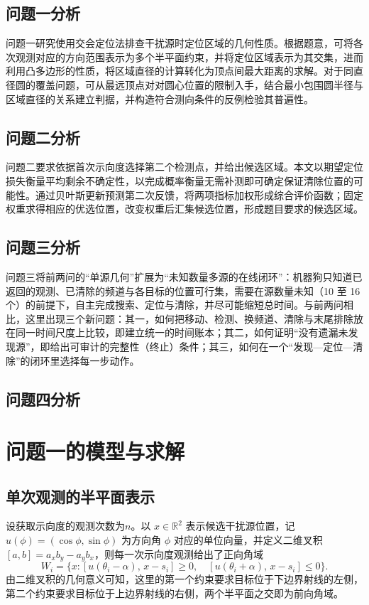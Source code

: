 \documentclass[UTF8,a4paper,zihao=-4,fontset=none]{ctexart}
\begin{document}
\subsection{问题一分析}

问题一研究使用交会定位法排查干扰源时定位区域的几何性质。根据题意，可将各次观测对应的方向范围表示为多个半平面约束，并将定位区域表示为其交集，进而利用凸多边形的性质，将区域直径的计算转化为顶点间最大距离的求解。对于同直径圆的覆盖问题，可从最远顶点对对圆心位置的限制入手，结合最小包围圆半径与区域直径的关系建立判据，并构造符合测向条件的反例检验其普遍性。

\subsection{问题二分析}

问题二要求依据首次示向度选择第二个检测点，并给出候选区域。本文以期望定位损失衡量平均剩余不确定性，以完成概率衡量无需补测即可确定保证清除位置的可能性。通过贝叶斯更新预测第二次反馈，将两项指标加权形成综合评价函数；固定权重求得相应的优选位置，改变权重后汇集候选位置，形成题目要求的候选区域。
\subsection{问题三分析}

问题三将前两问的“单源几何”扩展为“未知数量多源的在线闭环”：机器狗只知道已返回的观测、已清除的频道与各目标的位置可行集，需要在源数量未知（10 至 16 个）的前提下，自主完成搜索、定位与清除，并尽可能缩短总时间。与前两问相比，这里出现三个新问题：其一，如何把移动、检测、换频道、清除与末尾排除放在同一时间尺度上比较，即建立统一的时间账本；其二，如何证明“没有遗漏未发现源”，即给出可审计的完整性（终止）条件；其三，如何在一个“发现—定位—清除”的闭环里选择每一步动作。

\subsection{问题四分析}


\section{问题一的模型与求解}

\subsection{单次观测的半平面表示}

设获取示向度的观测次数为$n$。以 \(x\in\mathbb R^2\) 表示候选干扰源位置，记 \(u(\phi)=(\cos\phi,\sin\phi)\) 为方向角 \(\phi\) 对应的单位向量，并定义二维叉积 \([a,b]=a_xb_y-a_yb_x\)，则每一次示向度观测给出了正向角域
\begin{equation}
  W_i=\{x:[u(\theta_i-\alpha),\,x-s_i]\ge0,\quad [u(\theta_i+\alpha),\,x-s_i]\le0\}.
  \label{eq:wedge}
\end{equation}
由二维叉积的几何意义可知，这里的第一个约束要求目标位于下边界射线的左侧，第二个约束要求目标位于上边界射线的右侧，两个半平面之交即为前向角域。
\end{document}
